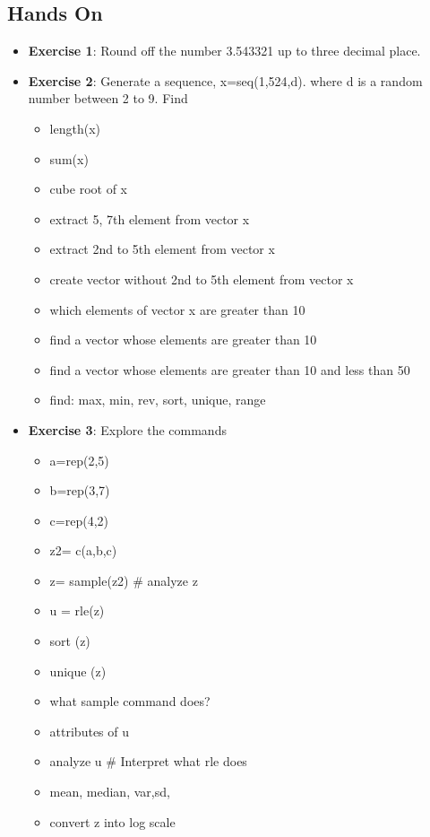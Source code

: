 \documentclass[12pt]{beamer}
\begin{document}
\begin{frame}[fragile]
\section{Hands On}
\begin{itemize}\justifying
	\item \textbf{Exercise 1}: Round off the number 3.543321 up to three
	decimal place.
	\item  \textbf{Exercise 2}: Generate a sequence, x=seq(1,524,d). where
	d is a random number between 2 to 9. Find
	\begin{itemize}\justifying
		\item length(x)
	\item sum(x)
	\item cube root of x
	\item extract 5, 7th element from vector x
	\item extract 2nd to 5th element from vector x
	\item create vector without 2nd to 5th element from
	vector x
	\item which elements of vector x are greater than 10
	\item find a vector whose elements are greater than 10
	\item find a vector whose elements are greater than 10
	and less than 50
	\item find: max, min, rev, sort, unique, range	
	\end{itemize}	

\end{itemize}
\end{frame}


\begin{frame}[fragile]
\begin{itemize}\justifying
	\item  \textbf{Exercise 3}: Explore the commands
	\begin{itemize}\justifying
		\item a=rep(2,5)
		\item b=rep(3,7)
		\item c=rep(4,2)
		\item z2= c(a,b,c)
		\item z= sample(z2) \# analyze z
		\item u = rle(z)
		\item sort (z)
		\item unique (z)
		\item what sample command does?
		\item attributes of u
		\item analyze u \# Interpret what rle does
		\item mean, median, var,sd,
		\item convert z into log scale
	\end{itemize}	
	
\end{itemize}
\end{frame}
\end{document}
